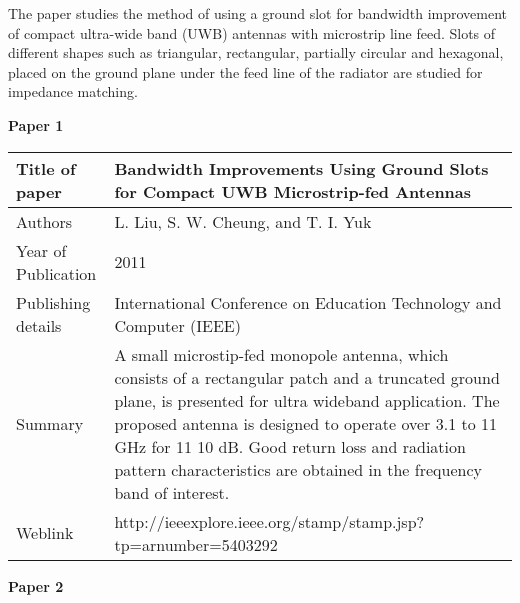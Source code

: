 \justify
	The paper studies the method of using a ground slot for bandwidth improvement of compact ultra-wide band (UWB) antennas 	with microstrip line feed. Slots of different shapes such as triangular, rectangular, partially circular and hexagonal, placed on the ground plane under the feed line of the radiator are studied for impedance matching. \\

	
	\begin{flushleft}
		\textbf{Paper 1}
	\end{flushleft}

	\begin{center}
		   \begin{table}[h]

		   	\begin{tabular}{ |l|p{11cm}| }
		   		\hline
		   		Title of paper &  Bandwidth Improvements Using Ground Slots for Compact UWB Microstrip-fed Antennas \\
		   		\hline
		   		Authors & L. Liu, S. W. Cheung, and T. I. Yuk \\
		   		\hline
		   		Year of Publication & 2011 \\
		   		\hline
		   		Publishing details & International Conference on Education Technology and Computer (IEEE) \\ \hline
		   		Summary & A small microstip-fed monopole antenna, which consists of a rectangular patch and a truncated ground plane, is presented for ultra wideband application. The proposed antenna is designed to operate over 3.1 to 11 GHz for 11 10 dB. Good return loss and radiation pattern characteristics are obtained in the frequency band of interest.\\
		   		\hline
		   		Weblink & http://ieeexplore.ieee.org/stamp/stamp.jsp?tp=arnumber=5403292 \\
		   		\hline
		   	\end{tabular}

		   \end{table}
	\end{center}

	\begin{flushleft}
		\textbf{Paper 2}
	\end{flushleft}


